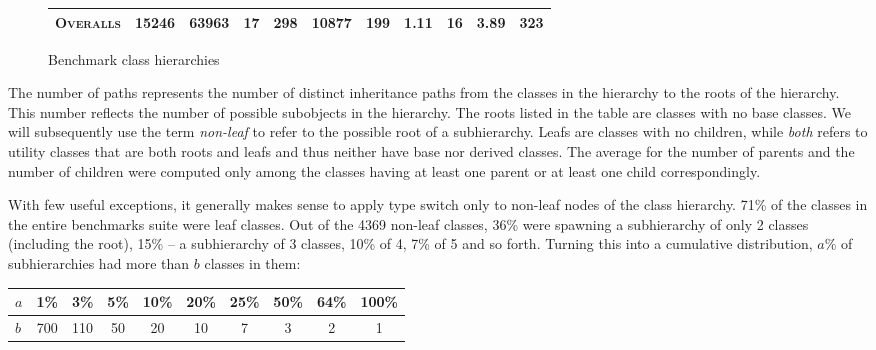 \begin{figure}[htbp]
\begin{tabular}{@{ }l@{ }||@{ }l@{ }|@{ }r@{ }|@{ }r@{ }|@{ }r@{ }|@{ }r@{ }|@{ }r@{ }|@{ }r@{ }|@{ }l@{ }|@{ }r@{ }|@{ }r@{ }|@{ }r@{ }}
\hline %
\multicolumn{2}{r|}{\tiny{\textsc{Overalls}}} &15246 & 63963 & 17 & 298 &10877 & 199 & 1.11 & 16 & 3.89 & 323 \\ %
\hline %
\end{tabular}
\caption{Benchmark class hierarchies}
\label{fig:benchmarks}
\end{figure}

The number of paths represents the number of distinct inheritance paths from the 
classes in the hierarchy to the roots of the hierarchy. This number reflects the number of possible subobjects in the 
hierarchy. The roots listed in the table are classes with no base classes. We 
will subsequently use the term \emph{non-leaf} to refer to the possible root of 
a subhierarchy. Leafs are classes with no children, while \emph{both} refers to 
utility classes that are both roots and leafs and thus neither have base nor 
derived classes. The average for the number of parents and the number of 
children were computed only among the classes having at least one parent or at 
least one child correspondingly.

With few useful exceptions, it generally makes sense to apply type switch only 
to non-leaf nodes of the class hierarchy. 71\% of the classes in the entire 
benchmarks suite were leaf classes. Out of the 4369 non-leaf classes, 36\% were 
spawning a subhierarchy of only 2 classes (including the root), 15\% -- a 
subhierarchy of 3 classes, 10\% of 4, 7\% of 5 and so forth. 
Turning this into a cumulative distribution, $a\%$ of subhierarchies had more 
than $b$ classes in them:

\begin{tabular}
{l||@{ }c@{ }|@{ }c@{ }|@{ }c@{ }|@{ }c@{ }|@{ }c@{ }|@{ }c@{ }|@{ }c@{ }|@{ }c@{ }|@{ }c@{ }}
$a$ & 1\% & 3\% & 5\% & 10\% & 20\% & 25\% & 50\% & 64\% & 100\% \\
\hline %
$b$ & 700 & 110 & 50  & 20   & 10   & 7    & 3    & 2    & 1
\end{tabular}


